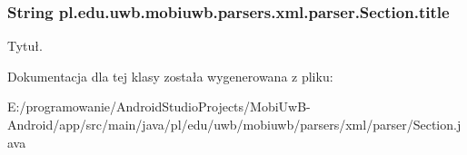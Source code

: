 \subsubsection[{title}]{\setlength{\rightskip}{0pt plus 5cm}String pl.\+edu.\+uwb.\+mobiuwb.\+parsers.\+xml.\+parser.\+Section.\+title}\label{classpl_1_1edu_1_1uwb_1_1mobiuwb_1_1parsers_1_1xml_1_1parser_1_1_section_abf4d72dc16a01248170787330e39a7dc}
Tytuł. 

Dokumentacja dla tej klasy została wygenerowana z pliku\+:\begin{DoxyCompactItemize}
\item 
E\+:/programowanie/\+Android\+Studio\+Projects/\+Mobi\+Uw\+B-\/\+Android/app/src/main/java/pl/edu/uwb/mobiuwb/parsers/xml/parser/Section.\+java\end{DoxyCompactItemize}
